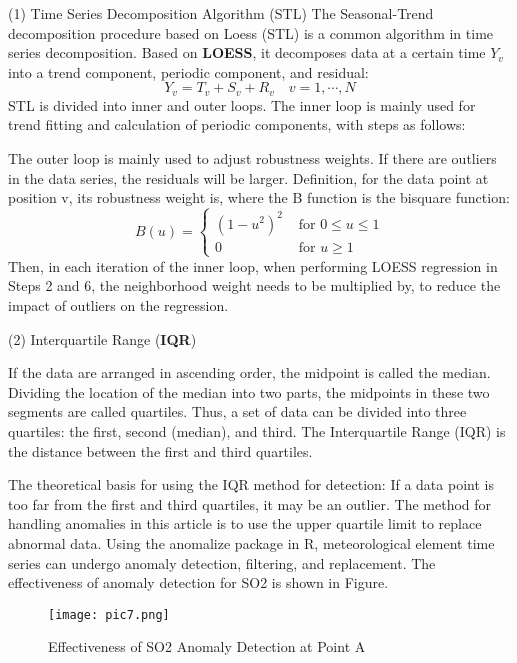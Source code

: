 \documentclass[12pt]{article}
\begin{document}
(1) Time Series Decomposition Algorithm (STL)
The Seasonal-Trend decomposition procedure based on Loess (STL) is a common algorithm in time series decomposition. Based on \textbf{LOESS}, it decomposes data at a certain time $Y_v$ into a trend component, periodic component, and residual:
\begin{equation}
	Y_v=T_v+S_v+R_v \quad v=1, \cdots, N
\end{equation}
STL is divided into inner and outer loops. The inner loop is mainly used for trend fitting and calculation of periodic components, with steps as follows:


The outer loop is mainly used to adjust robustness weights. If there are outliers in the data series, the residuals will be larger. Definition, for the data point at position v, its robustness weight is, where the B function is the bisquare function:
\begin{equation}
	B(u)= \begin{cases}\left(1-u^2\right)^2 & \text { for } 0 \leq u \leq 1 \\ 0 & \text { for } u \geq 1\end{cases}
\end{equation}
Then, in each iteration of the inner loop, when performing LOESS regression in Steps 2 and 6, the neighborhood weight needs to be multiplied by, to reduce the impact of outliers on the regression.

(2) Interquartile Range (\textbf{IQR})

If the data are arranged in ascending order, the midpoint is called the median. Dividing the location of the median into two parts, the midpoints in these two segments are called quartiles. Thus, a set of data can be divided into three quartiles: the first, second (median), and third. The Interquartile Range (IQR) is the distance between the first and third quartiles.

The theoretical basis for using the IQR method for detection: If a data point is too far from the first and third quartiles, it may be an outlier. The method for handling anomalies in this article is to use the upper quartile limit to replace abnormal data. Using the anomalize package in R, meteorological element time series can undergo anomaly detection, filtering, and replacement. The effectiveness of anomaly detection for SO2 is shown in Figure.

\begin{figure}[H]
	\caption{Effectiveness of SO2 Anomaly Detection at Point A}
	\label{pic7}
	\centering
	\texttt{[image: pic7.png]}
\end{figure}
\end{document}
